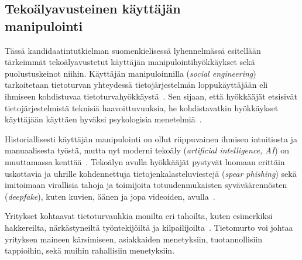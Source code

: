 
\begin{otherlanguage}{finnish}
\chapter*{Tekoälyavusteinen käyttäjän\\manipulointi\label{chapter:finnish}}
\begin{comment}
\end{comment}


Tässä kandidaatintutkielman suomenkielisessä lyhennelmässä esitellään tärkeimmät tekoälyavustetut käyttäjän manipulointihyökkäykset sekä puolustuskeinot niihin. Käyttäjän manipuloinnilla (\textit{social engineering}) tarkoitetaan tietoturvan yhteydessä tietojärjestelmän loppukäyttäjään eli ihmiseen kohdistuvaa tietoturvahyökkäystä~\citep{hatfield_SE_Evolution_Concept_2018}. Sen sijaan, että hyökkääjät etsisivät tietojärjestelmistä teknisiä haavoittuvuuksia, he kohdistavatkin hyökkäykset käyttäjään käyttäen hyväksi psykologisia menetelmiä~\citep{wang_Defining_Social_Engineering_2020}.

Historiallisesti käyttäjän manipulointi on ollut riippuvainen ihmisen intuitiosta ja manuaalisesta työstä, mutta nyt moderni tekoäly (\textit{artificial intelligence, AI}) on muuttamassa kenttää~\citep{blauth_AI_Crime_Overview_Malicious_Use_Abuse_2022, king_AI_Crime_Interdisciplinary_Analysis_2019, mirsky_Threat_Offensive_AI_Organizations_2023}. Tekoälyn avulla hyökkääjät pystyvät luomaan erittäin uskottavia ja uhrille kohdennettuja tietojenkalasteluviestejä (\textit{spear phishing}) sekä imitoimaan virallisia tahoja ja toimijoita totuudenmukaisten syväväärennösten (\textit{deepfake}), kuten kuvien, äänen ja jopa videoiden, avulla~\citep{mirsky_Creation_Detection_Deepfakes_2021}.

Yritykset kohtaavat tietoturvauhkia monilta eri tahoilta, kuten esimerkiksi hakkereilta, närkästyneiltä työntekijöiltä ja kilpailijoilta~\citep{mirsky_Threat_Offensive_AI_Organizations_2023}. Tietomurto voi johtaa yrityksen maineen kärsimiseen, asiakkaiden menetyksiin, tuotannollisiin tappioihin, sekä muihin rahallisiin menetyksiin.




\end{otherlanguage}

